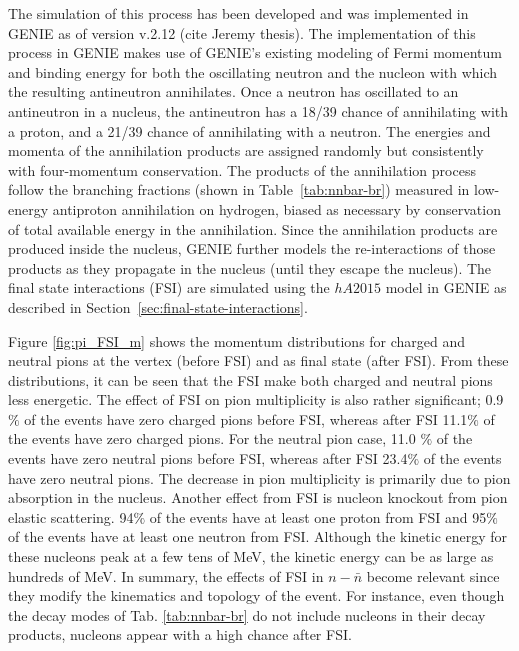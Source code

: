 The simulation of this process has been developed and was implemented in GENIE as of version v.2.12 (cite Jeremy thesis). The implementation of this process in GENIE makes use of GENIE's existing modeling of Fermi momentum and binding energy for both the oscillating neutron and the nucleon with which the resulting antineutron annihilates.   Once a neutron has oscillated to an antineutron in a nucleus, the antineutron has a 18/39 chance of annihilating with a proton, and a 21/39 chance of annihilating with a neutron. The energies and momenta of the annihilation products are assigned randomly but consistently with four-momentum conservation. The products of the annihilation process follow the branching fractions (shown in Table~\ref{tab:nnbar-br}) measured in low-energy antiproton annihilation on hydrogen, biased as necessary by conservation of total available energy in the annihilation. Since the annihilation products are produced inside the nucleus, GENIE further models the re-interactions of those products as they propagate in the nucleus (until they escape the nucleus).  The final state interactions (FSI) are simulated using the $hA2015$ model in GENIE as described in Section~\ref{sec:final-state-interactions}.

Figure \ref{fig:pi_FSI_m} shows the momentum distributions for charged and neutral pions at the vertex (before FSI) and as final state (after FSI). From these distributions, it can be seen that the FSI make both charged and neutral pions less energetic.  The effect of FSI on pion multiplicity is also rather significant; 0.9$\%$ of the events have zero charged pions before FSI, whereas after FSI 11.1$\%$ of the events have zero charged pions. For the neutral pion case, 11.0 $\%$ of the events have zero neutral pions before FSI, whereas after FSI 23.4$\%$ of the events have zero neutral pions. The decrease in pion multiplicity is primarily due to pion absorption in the nucleus. Another effect from FSI is nucleon knockout from pion elastic scattering. 94$\%$ of the events have at least one proton from FSI and 95$\%$ of the events have at least one neutron from FSI. Although the kinetic energy for these nucleons peak at a few tens of MeV, the kinetic energy can be as large as hundreds of MeV.  In summary, the effects of FSI in $n-\bar{n}$ become relevant since they modify the kinematics and topology of the event. For instance, even though the decay modes of Tab. \ref{tab:nnbar-br} do not include nucleons in their decay products, nucleons appear with a high chance after FSI.

